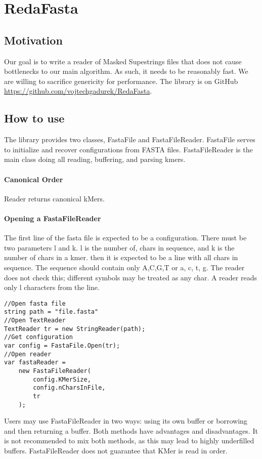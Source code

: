\chapter{RedaFasta}\label{RedaFasta}
\section{Motivation}
Our goal is to write a reader of Masked Supestrings files that does not cause bottlenecks to our main algorithm. As such, it needs to be reasonably fast. We are willing to sacrifice genericity for performance. The library is on GitHub \url{https://github.com/vojtechgadurek/RedaFasta}. 

\section{How to use}
The library provides two classes, FastaFile and FastaFileReader. FastaFile serves to initialize and recover configurations from FASTA files. FastaFileReader is the main class doing all reading, buffering, and parsing kmers.

\subsubsection{Canonical Order}
Reader returns canonical kMers.

\subsubsection{Opening a FastaFileReader}
The first line of the fasta file is expected to be a configuration. There must be two parameters
l and k. l is the number of, chars in sequence, and k is the number of chars in a kmer.
then it is expected to be a line with all chars in sequence. The sequence should contain only A,C,G,T or a, c, t, g. The reader does not check this; different symbols may be treated as any char. A reader reads only l characters from the line.

\begin{lstlisting}
//Open fasta file
string path = "file.fasta"
//Open TextReader
TextReader tr = new StringReader(path);
//Get configuration
var config = FastaFile.Open(tr);
//Open reader
var fastaReader = 
    new FastaFileReader(
        config.KMerSize, 
        config.nCharsInFile, 
        tr
    );
\end{lstlisting}
Users may use FastaFileReader in two ways: using its own buffer or borrowing and then returning a buffer. Both methods have advantages and disadvantages. It is not recommended to mix both methods, as this may lead to highly underfilled buffers. FastaFileReader does not guarantee that KMer is read in order.
